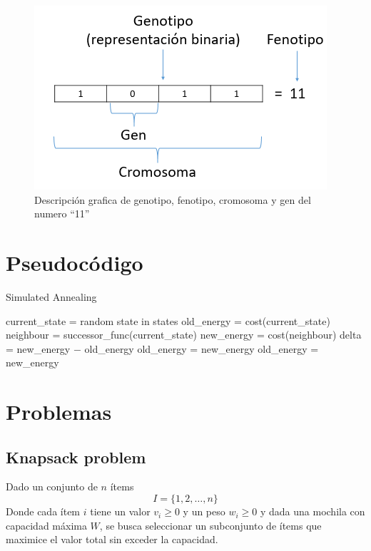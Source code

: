\documentclass[12pt,twoside]{article}
\begin{document}
	\begin{figure}[H]
		\centering
		\includegraphics[width=0.75\linewidth]{img/fen_gen.png}
		\caption{Descripción grafica de genotipo, fenotipo, cromosoma y gen del numero ``11''}
		\label{fig:fen_gen}
	\end{figure}
	
	\clearpage
	\section{Pseudocódigo}
	
	\begin{algorithm}[H]
		\caption{Simulated Annealing}
		\begin{algorithmic}[1]
			\State current\_state = random state in states 
			\State old\_energy = cost(current\_state) 
			\State neighbour = successor\_func(current\_state)
			\State new\_energy = cost(neighbour)
			\State delta = new\_energy $-$ old\_energy 
			\State old\_energy = new\_energy
			\EndIf
			\Else
			\State old\_energy = new\_energy
			\EndIf
			\EndFor 
			\EndFor
		\end{algorithmic}
		\label{alg:simulated_annealing}
	\end{algorithm}
	
	\clearpage
	\section{Problemas}
	
	\subsection{Knapsack problem}
	
	Dado un conjunto de $n$ ítems \[I = \{1,2, \dots, n \}\] Donde cada ítem $i$ tiene un valor $v_i \geq 0$ y un peso $w_i \geq 0$ y dada una mochila con capacidad máxima $W$, se busca seleccionar un subconjunto de ítems que maximice el valor total sin exceder la capacidad.
	
\end{document}

